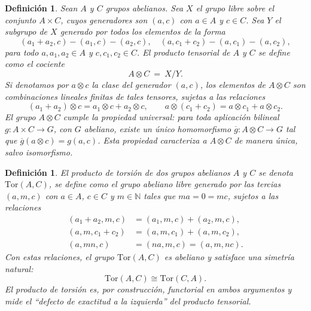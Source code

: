 \documentclass[12pt]{book}
\theoremstyle{plain}
\numberwithin{equation}{section} %
\newtheorem{definition}[thm]{Definición}
\begin{document}
\begin{definition}\label{def:tensor-product}
Sean $A$ y $C$ grupos abelianos. Sea $X$ el grupo libre sobre el conjunto
$A \times C$, cuyos generadores son $(a,c)$ con $a \in A$ y $c \in C$.
Sea $Y$ el subgrupo de $X$ generado por todos los elementos de la forma
\[
(a_1 + a_2, c) - (a_1, c) - (a_2, c), \quad
(a, c_1 + c_2) - (a, c_1) - (a, c_2),
\]
para todo $a,a_1,a_2 \in A$ y $c,c_1,c_2 \in C$. El \textit{producto tensorial}
de $A$ y $C$ se define como el cociente
\[
A \otimes C \ =\ X / Y.
\]
Si denotamos por $a \otimes c$ la clase del generador $(a,c)$, los elementos de
$A \otimes C$ son combinaciones lineales finitas de tales tensores, sujetas a
las relaciones
\[
(a_1 + a_2) \otimes c = a_1 \otimes c + a_2 \otimes c, \qquad
a \otimes (c_1 + c_2) = a \otimes c_1 + a \otimes c_2.
\]
El grupo $A \otimes C$ cumple la \textit{propiedad universal}: para toda
aplicación bilineal $g : A \times C \to G$, con $G$ abeliano, existe un único
homomorfismo $\overline{g} : A \otimes C \to G$ tal que
$\overline{g}(a \otimes c) = g(a,c)$. Esta propiedad caracteriza a
$A \otimes C$ de manera única, salvo isomorfismo.
\end{definition}

\begin{definition}\label{def:tor}
El \textit{producto de torsión} de dos grupos abelianos $A$ y $C$ se denota
$\mathrm{Tor}(A,C)$, se define como el grupo abeliano libre generado por las tercias
$(a,m,c)$ con $a \in A$, $c \in C$ y $m \in \mathbb{N}$ tales que $ma = 0 = mc$,
sujetos a las relaciones
\[
\begin{aligned*}
(a_1 + a_2, m, c) &= (a_1, m, c) + (a_2, m, c),\\
(a, m, c_1 + c_2) &= (a, m, c_1) + (a, m, c_2),\\
(a, mn, c) &= (na, m, c) = (a, m, nc).
\end{aligned*}
\]
Con estas relaciones, el grupo $\mathrm{Tor}(A,C)$ es abeliano y satisface una
\textit{simetría natural}:
\[
\mathrm{Tor}(A,C) \cong \mathrm{Tor}(C,A).
\]
El producto de torsión es, por construcción, functorial en ambos argumentos y
mide el ``defecto de exactitud a la izquierda'' del producto tensorial.
\end{definition}

\end{document}
